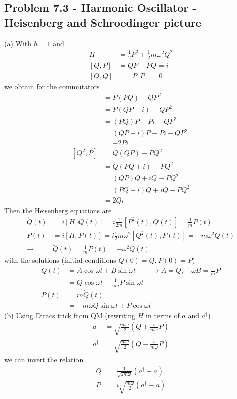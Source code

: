 \documentclass[10pt,a4paper]{book}
\theoremstyle{definition}
\begin{document}
\subsection{Problem 7.3 - Harmonic Oscillator  - Heisenberg and Schroedinger picture}
(a) With $\hbar=1$ and
\begin{align}
H&=\frac{1}{2}P^2+\frac{1}{2}m\omega^2Q^2\\
[Q,P]&=QP-PQ=i\\
[Q,Q]&=[P,P]=0
\end{align}
we obtain for the commutators
\begin{align}
[P^2,Q]
&=P(PQ)-QP^2\\
&=P(QP-i)-QP^2\\
&=(PQ)P-Pi-QP^2\\
&=(QP-i)P-Pi-QP^2\\
&=-2Pi\\
[Q^2,P]
&=Q(QP)-PQ^2\\
&=Q(PQ+i)-PQ^2\\
&=(QP)Q+iQ-PQ^2\\
&=(PQ+i)Q+iQ-PQ^2\\
&=2Qi
\end{align}
Then the Heisenberg equations are
\begin{align}
\dot Q(t)&=i[H,Q(t)]=i\frac{1}{2m}[P^2(t),Q(t)]=\frac{1}{m}P(t)\\
\dot P(t)&=i[H,P(t)]=i\frac{1}{2}m\omega^2[Q^2(t),P(t)]=-m\omega^2Q(t)\\
\rightarrow &\ddot Q(t)=\frac{1}{m}\dot P(t)=-\omega^2 Q(t)
\end{align}
with the solutions (initial conditions $Q(0)=Q, P(0)=P$)
\begin{align}
Q(t)&=A\cos\omega t+B\sin\omega t\qquad\rightarrow A=Q,\quad\omega B=\frac{1}{m}P\\
&=Q\cos\omega t+\frac{1}{\omega m}P\sin\omega t\\
P(t)&=m\dot Q(t)\\
&=-m\omega Q\sin\omega t+P\cos\omega t
\end{align}
(b) Using Diracs trick from QM (rewriting $H$ in terms of $a$ and $a^\dagger$)
\begin{align}
a&=\sqrt{\frac{m\omega}{2}}(Q+\frac{i}{m\omega}P)\\
a^\dagger&=\sqrt{\frac{m\omega}{2}}(Q-\frac{i}{m\omega}P)
\end{align}
we can invert the relation
\begin{align}
Q&=\frac{1}{\sqrt{2m\omega}}(a^\dagger+a)\\
P&=i\sqrt{\frac{m\omega}{2}}(a^\dagger-a)
\end{align}
\end{document}
